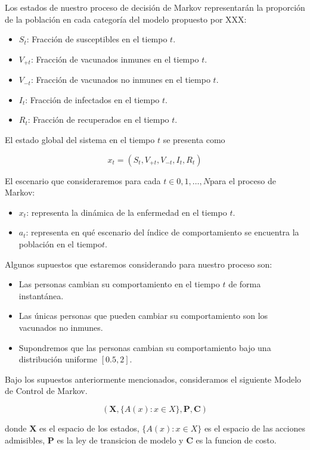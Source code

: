 \documentclass[
  letterpaper,
  DIV=11,
  numbers=noendperiod]{scrreprt}
\providecommand{\tightlist}{%
  \setlength{\itemsep}{0pt}\setlength{\parskip}{0pt}}\usepackage{longtable,booktabs,array}
\begin{document}
Los estados de nuestro proceso de decisión de Markov representarán la
proporción de la población en cada categoría del modelo propuesto por
XXX:

\begin{itemize}
\item
  \(S_{t}\): Fracción de susceptibles en el tiempo \(t\).
\item
  \(V_{+t}\): Fracción de vacunados inmunes en el tiempo \(t\).
\item
  \(V_{-t}\): Fracción de vacunados no inmunes en el tiempo \(t\).
\item
  \(I_{t}\): Fracción de infectados en el tiempo \(t\).
\item
  \(R_{t}\): Fracción de recuperados en el tiempo \(t\).
\end{itemize}

El estado global del sistema en el tiempo \(t\) se presenta como

\[
x_{t} = (S_{t}, V_{+t}, V_{-t}, I_{t}, R_{t})
\]

El escenario que consideraremos para cada \(t \in {0,1,\dots, N}\)para
el proceso de Markov:

\begin{itemize}
\tightlist
\item
  \(x_{t}\): representa la dinámica de la enfermedad en el tiempo \(t\).
\item
  \(a_{t}\): representa en qué escenario del índice de comportamiento se
  encuentra la población en el tiempo\(t\).
\end{itemize}

Algunos supuestos que estaremos considerando para nuestro proceso son:

\begin{itemize}
\tightlist
\item
  Las personas cambian su comportamiento en el tiempo \(t\) de forma
  instantánea.
\item
  Las únicas personas que pueden cambiar su comportamiento son los
  vacunados no inmunes.
\item
  Supondremos que las personas cambian su comportamiento bajo una
  distribución uniforme \([0.5, 2]\).
\end{itemize}

Bajo los supuestos anteriormente mencionados, consideramos el siguiente
Modelo de Control de Markov.

\[
(\mathbf{X},  \{A(x): x \in X\}, \mathbf{P}, \mathbf{C})
\]

donde \(\mathbf{X}\) es el espacio de los estados, \(\{A(x): x \in X\}\)
es el espacio de las acciones admisibles, \(\mathbf{P}\) es la ley de
transicion de modelo y \(\mathbf{C}\) es la funcion de costo.
\end{document}
